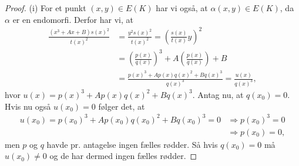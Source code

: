 \begin{proof}
(i) For et punkt $(x, y) \in E(K)$ har vi også, at $\alpha(x, y) \in E(K)$, da $\alpha$ er en endomorfi. Derfor har vi, at
\begin{align*}
	\frac{(x^3 + Ax + B)s(x)^2}{t(x)^2} &= \frac{y^2 s(x)^2}{t(x)^2} = \left( \frac{s(x)}{t(x)}y \right)^2 \\
	&= \left( \frac{p(x)}{q(x)} \right)^3 + A \left( \frac{p(x)}{q(x)} \right) + B \\
	&= \frac{p(x)^3 + A p(x) q(x)^2 + B q(x)^3}{q(x)^3} = \frac{u(x)}{q(x)^3},
\end{align*}
hvor $u(x) = p(x)^3 + A p(x) q(x)^2 + B q(x)^3$. Antag nu, at $q(x_0)=0$. Hvis nu også $u(x_0)=0$ følger det, at
\begin{align*}
	u(x_0)=p(x_0)^3 + A p(x_0) q(x_0)^2 + B q(x_0)^3 = 0 &\Rightarrow p(x_0)^3 = 0 \\ &\Rightarrow p(x_0)=0,
\end{align*}
men $p$ og $q$ havde pr. antagelse ingen fælles rødder. Så hvis $q(x_0) = 0$ må $u(x_0) \neq 0$ og de har dermed ingen fælles rødder.


\end{proof}
